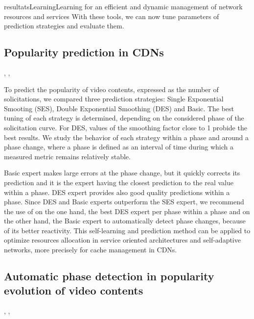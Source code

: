 \documentclass{ra2016}
\begin{document}
\begin{module}{resultats}{Learning}{Learning for an efficient and dynamic management of network resources and services}
With these tools, we can now tune parameters of prediction strategies and evaluate them.

\subsection{Popularity prediction in CDNs}
\begin{participants}
,
,
\end{participants}

To predict the popularity of video contents, expressed as the number of solicitations, we compared three prediction strategies: Single Exponential Smooting (SES), Double Exponential Smoothing (DES) and Basic. The best tuning of each strategy is
determined, depending on the considered phase of the solicitation
curve. For DES, values of the smoothing factor close to 1 probide the best results. We study the behavior of each strategy within a phase and around a phase change, where a phase is defined as an interval of time
during which a measured metric remains relatively stable.

Basic expert makes large errors at the phase change,
but it quickly corrects its prediction and it is the expert having
the closest prediction to the real value within a phase. DES expert provides also good quality predictions within a phase.
Since DES and Basic experts outperform the SES expert,
we recommend the use of on the one hand, the best DES
expert per phase within a phase and on the other hand, the
Basic expert to automatically detect phase changes, because of
its better reactivity. This self-learning and prediction
method can be applied to optimize resources allocation in service
oriented architectures and self-adaptive networks, more precisely
for cache management in CDNs.

\subsection{Automatic phase detection in popularity evolution of video contents}
\begin{participants}
,
,
\end{participants}


\end{module}
\end{document}
